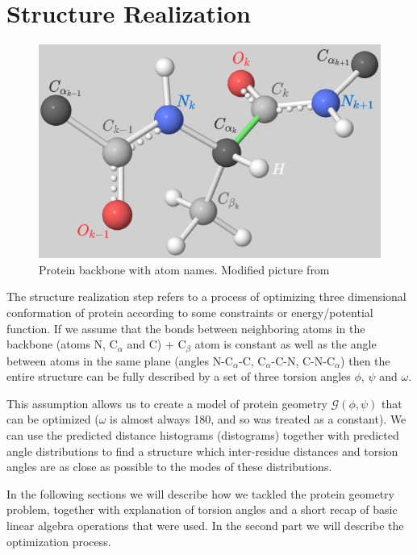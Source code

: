 

\section{Structure Realization}

\begin{figure}
    \centering
    \includegraphics[scale=0.5]{imgs_tomas/backbone.png}
    \caption{Protein backbone with atom names. Modified picture from \cite{ramachandran}}
    \label{fig:backbone}
\end{figure}

The structure realization step refers to a process of optimizing three dimensional conformation of protein according to some constraints or energy/potential function. If we assume that the bonds between neighboring atoms in the backbone (atoms N, C$_\alpha$ and C) + C$_\beta$ atom is constant as well as the angle between atoms in the same plane (angles N-C$_{\alpha}$-C, C$_{\alpha}$-C-N, C-N-C$_{\alpha}$) then the entire structure can be fully described by a set of three torsion angles $\phi$, $\psi$ and $\omega$.

This assumption allows us to create a model of protein geometry $\mathcal{G}(\phi, \psi)$ that can be optimized ($\omega$ is almost always 180\degree, and so was treated as a constant). We can use the predicted distance histograms (distograms) together with predicted angle distributions to find a structure which inter-residue distances and torsion angles are as close as possible to the modes of these distributions.

In the following sections we will describe how we tackled the protein geometry problem, together with explanation of torsion angles and a short recap of basic linear algebra operations that were used. In the second part we will describe the optimization process.

